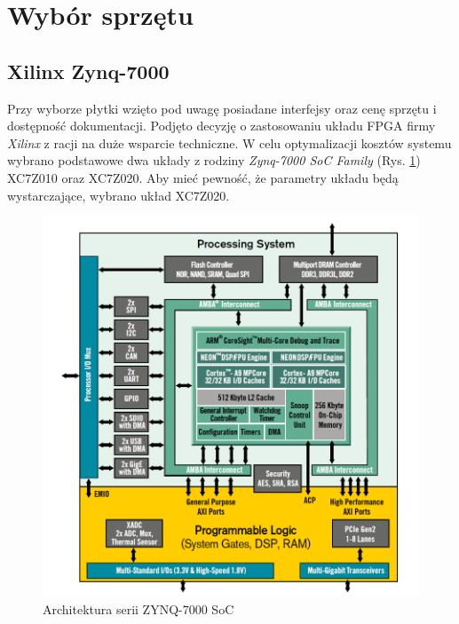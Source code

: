 \newpage %
\cleardoublepage %
\pagestyle{headings}

\section{Wybór sprzętu}

\subsection{Xilinx Zynq-7000}

Przy wyborze płytki wzięto pod uwagę posiadane interfejsy oraz cenę sprzętu i dostępność dokumentacji. Podjęto decyzję o zastosowaniu układu FPGA firmy \emph{Xilinx} z racji na duże wsparcie techniczne. W celu optymalizacji kosztów systemu wybrano podstawowe dwa układy z rodziny \emph{Zynq-7000 SoC Family} (Rys. \ref{zynq7000}) XC7Z010 oraz XC7Z020. Aby mieć pewność, że parametry układu będą wystarczające, wybrano układ XC7Z020. 

\begin{figure}[h]
  \centering
  \includegraphics[width=\textwidth]{img/zynq7000.png}
  \caption{Architektura serii ZYNQ-7000 SoC}
  \label{zynq7000}
\end{figure}

